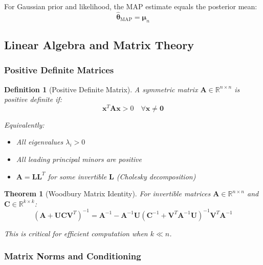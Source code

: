 \documentclass[11pt]{article}
\newtheorem{theorem}{Theorem}[section]
\newtheorem{definition}{Definition}[section]
\begin{document}
For Gaussian prior and likelihood, the MAP estimate equals the posterior mean:
\begin{equation}
\hat{\bm{\theta}}_{\text{MAP}} = \bm{\mu}_n
\end{equation}

\subsection{Linear Algebra and Matrix Theory}

\subsubsection{Positive Definite Matrices}

\begin{definition}[Positive Definite Matrix]
A symmetric matrix $\mathbf{A} \in \mathbb{R}^{n \times n}$ is positive definite if:
\begin{equation}
\mathbf{x}^T\mathbf{A}\mathbf{x} > 0 \quad \forall \mathbf{x} \neq \mathbf{0}
\end{equation}

Equivalently:
\begin{itemize}
\item All eigenvalues $\lambda_i > 0$
\item All leading principal minors are positive
\item $\mathbf{A} = \mathbf{L}\mathbf{L}^T$ for some invertible $\mathbf{L}$ (Cholesky decomposition)
\end{itemize}
\end{definition}

\begin{theorem}[Woodbury Matrix Identity]
For invertible matrices $\mathbf{A} \in \mathbb{R}^{n \times n}$ and $\mathbf{C} \in \mathbb{R}^{k \times k}$:
\begin{equation}
(\mathbf{A} + \mathbf{U}\mathbf{C}\mathbf{V}^T)^{-1} = \mathbf{A}^{-1} - \mathbf{A}^{-1}\mathbf{U}(\mathbf{C}^{-1} + \mathbf{V}^T\mathbf{A}^{-1}\mathbf{U})^{-1}\mathbf{V}^T\mathbf{A}^{-1}
\end{equation}

This is critical for efficient computation when $k \ll n$.
\end{theorem}

\subsubsection{Matrix Norms and Conditioning}
\end{document}
